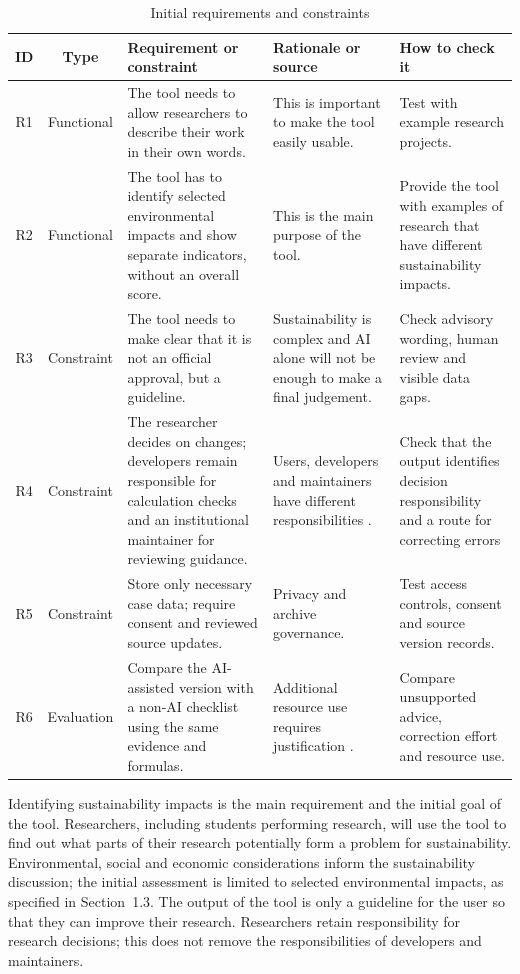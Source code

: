 \documentclass[11pt,a4paper]{article}
\begin{document}
\begin{table}[H]
\centering
\small
\begin{tabularx}{\textwidth}{|c|c|X|X|X|}
\hline
\textbf{ID} & \textbf{Type} & \textbf{Requirement or constraint} & 
\textbf{Rationale or source} & \textbf{How to check it} \\
\hline

R1 & Functional &
The tool needs to allow researchers to describe their work in their own words. &
This is important to make the tool easily usable. &
Test with example research projects. \\
\hline

R2 & Functional &
The tool has to identify selected environmental impacts and show separate indicators, without an overall score. &
This is the main purpose of the tool. &
Provide the tool with examples of research that have different sustainability impacts. \\
\hline

R3 & Constraint &
The tool needs to make clear that it is not an official approval, but a guideline. &
Sustainability is complex and AI alone will not be enough to make a final judgement. &
Check advisory wording, human review and visible data gaps.\\
\hline

R4 & Constraint &
The researcher decides on changes; developers remain responsible for calculation checks and an institutional maintainer for reviewing guidance. &
Users, developers and maintainers have different responsibilities \citep{santoni2018control}. &
Check that the output identifies decision responsibility and a route for correcting errors \\
\hline

R5 & Constraint & Store only necessary case data; require consent and reviewed source updates. & Privacy and archive governance. & Test access controls, consent and source version records. \\
\hline
R6 & Evaluation & Compare the AI-assisted version with a non-AI checklist using the same evidence and formulas. & Additional resource use requires justification \citep{lin2023cost}. & Compare unsupported advice, correction effort and resource use. \\
\hline

\end{tabularx}
\caption{Initial requirements and constraints}
\label{tab:requirements}
\end{table}

Identifying sustainability impacts is the main requirement and the initial goal of the tool. Researchers, including students performing research, will use the tool to find out what parts of their research potentially form a problem for sustainability. 
Environmental, social and economic considerations inform the sustainability discussion; the initial assessment is limited to selected environmental impacts, as specified in Section~1.3. The output of the tool is only a guideline for the user so that they can improve their research. Researchers retain responsibility for research decisions; this does not remove the responsibilities of developers and maintainers.
\end{document}
